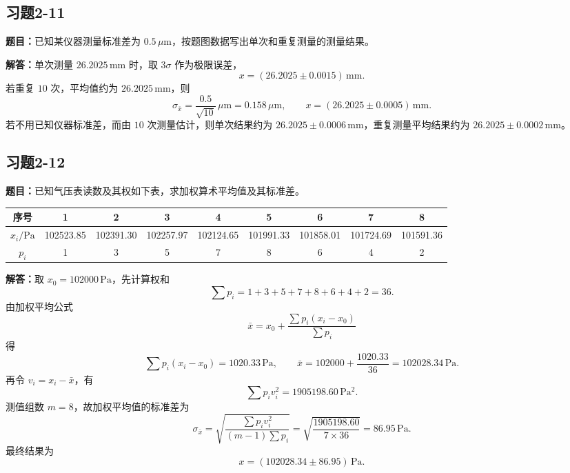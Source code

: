 \documentclass[UTF8,zihao=-4]{ctexart}
\newcommand{\problem}[1]{\subsection*{#1}}
\newcommand{\timu}{\noindent\textbf{题目：}}
\newcommand{\jieda}{\noindent\textbf{解答：}}
\begin{document}
{\problem{习题2-11}
\timu 已知某仪器测量标准差为 $0.5\,\mu\mathrm{m}$，按题图数据写出单次和重复测量的测量结果。

\jieda 单次测量 $26.2025\,\mathrm{mm}$ 时，取 $3\sigma$ 作为极限误差，
\begin{equation*}
    x=(26.2025\pm0.0015)\,\mathrm{mm}.
\end{equation*}
若重复 $10$ 次，平均值约为 $26.2025\,\mathrm{mm}$，则
\begin{equation*}
    \sigma_{\bar{x}}=\frac{0.5}{\sqrt{10}}\,\mu\mathrm{m}=0.158\,\mu\mathrm{m},
    \qquad
    x=(26.2025\pm0.0005)\,\mathrm{mm}.
\end{equation*}
若不用已知仪器标准差，而由 $10$ 次测量估计，则单次结果约为 $26.2025\pm0.0006\,\mathrm{mm}$，重复测量平均结果约为 $26.2025\pm0.0002\,\mathrm{mm}$。

\problem{习题2-12}
\timu 已知气压表读数及其权如下表，求加权算术平均值及其标准差。

\begin{center}
\scriptsize
\setlength{\tabcolsep}{4pt}
\begin{tabular}{c|cccccccc}
\toprule
序号 & 1 & 2 & 3 & 4 & 5 & 6 & 7 & 8\\
\midrule
$x_i/\mathrm{Pa}$ & 102523.85 & 102391.30 & 102257.97 & 102124.65 & 101991.33 & 101858.01 & 101724.69 & 101591.36\\
$p_i$ & 1 & 3 & 5 & 7 & 8 & 6 & 4 & 2\\
\bottomrule
\end{tabular}
\end{center}

\jieda 取 $x_0=102000\,\mathrm{Pa}$，先计算权和
\begin{equation*}
    \sum p_i=1+3+5+7+8+6+4+2=36.
\end{equation*}
由加权平均公式
\begin{equation*}
    \bar{x}=x_0+\frac{\sum p_i(x_i-x_0)}{\sum p_i}
\end{equation*}
得
\begin{equation*}
    \sum p_i(x_i-x_0)=1020.33\,\mathrm{Pa},\qquad
    \bar{x}=102000+\frac{1020.33}{36}=102028.34\,\mathrm{Pa}.
\end{equation*}
再令 $v_i=x_i-\bar{x}$，有
\begin{equation*}
    \sum p_i v_i^2=1905198.60\,\mathrm{Pa^2}.
\end{equation*}
测值组数 $m=8$，故加权平均值的标准差为
\begin{equation*}
    \sigma_{\bar{x}}
    =\sqrt{\frac{\sum p_i v_i^2}{(m-1)\sum p_i}}
    =\sqrt{\frac{1905198.60}{7\times36}}
    =86.95\,\mathrm{Pa}.
\end{equation*}
最终结果为
\begin{equation*}
    x=(102028.34\pm86.95)\,\mathrm{Pa}.
\end{equation*}

}
\end{document}

